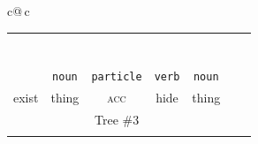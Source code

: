 \documentclass[a4paper,landscape,headrule,footrule,dvips]{foils}
\newcommand{\sa}[2]{\rnode{c#1}{\iz{#2}}}%
\begin{document}
\begin{CJK}{UTF8}{min}
{\begin{tabular}{c@{\,}c}
 \begin{tabular}{ccccccc}
    &\multicolumn{5}{c}{\sa{1}{NP-frag}}  \\[1ex]
    &\multicolumn{5}{c}{\sa{2}{\wl{rel-cl-sbj-gap}}}  \\[1ex]
    &\multicolumn{3}{c}{\sa{3}{hd-complement}} & \sa{4}{N} \\[1ex]
    \multicolumn{3}{c}{\sa{5}{hd-complement}} & \multicolumn{1}{c}{\sa{J}{V}} &
    \\[1ex]
    \multicolumn{2}{c}{\sa{I}{\ul{rel-cl-sbj-gap}}} & & &  & \\[1ex]
    \sa{H}{V} & \sa{7}{N}      & \sa{8}{CASE-P} &   &  \\[1ex]
    \sa{G}{ある} & \sa{B}{物事} & \sa{C}{を} & \sa{D}{隠す} &  \sa{F}{ 物} \\
   \texttt{\emp{\ul{verb}}} & \texttt{noun} & \texttt{particle} & \texttt{verb} & \texttt{noun} \\
    exist & thing &  \textsc{acc} & hide &  thing \\
   \multicolumn{5}{c}{Tree \#3} \\ \\
 \end{tabular}
  \centering
   
   
   
    
   
   



\end{tabular}}
\end{CJK}
\end{document}
